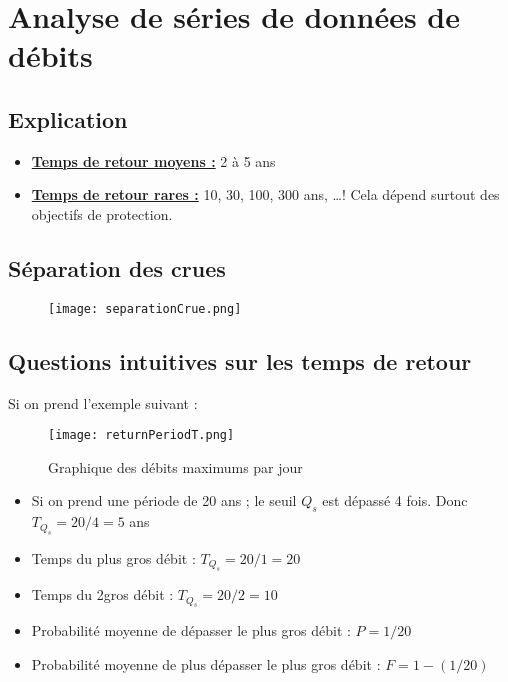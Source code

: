 \chapter{Analyse de séries de données de débits}

\section{Explication}
\begin{itemize}
    \item \underline{\textbf{Temps de retour moyens :}} 2 à 5 ans
    \item \underline{\textbf{Temps de retour rares :}} 10, 30, 100, 300 ans, \dots ! Cela dépend surtout des objectifs de protection.
\end{itemize}

\section{Séparation des crues}
\begin{figure}[H]
    \centering
    \texttt{[image: separationCrue.png]}
    \label{fig:separationCrues}
\end{figure}

\newpage

\section{Questions intuitives sur les temps de retour}
Si on prend l'exemple suivant :
\begin{figure}[h!]
    \centering
    \texttt{[image: returnPeriodT.png]}
    \caption{Graphique des débits maximums par jour}
    \label{fig:graphiqueExemple}
\end{figure}

\begin{itemize}
    \item Si on prend une période de 20 ans ; le seuil $Q_s$ est dépassé 4 fois. Donc $T_{Q_{s}} = 20/4 = 5$ ans
    \item Temps du plus gros débit : $T_{Q_{s}} = 20/1 = 20$
    \item Temps du 2\ieme gros débit : $T_{Q_{s}} = 20/2 = 10$
    \item Probabilité moyenne de dépasser le plus gros débit : $P = 1/20$
    \item Probabilité moyenne de plus dépasser le plus gros débit : $F=1-(1/20)$
\end{itemize}

